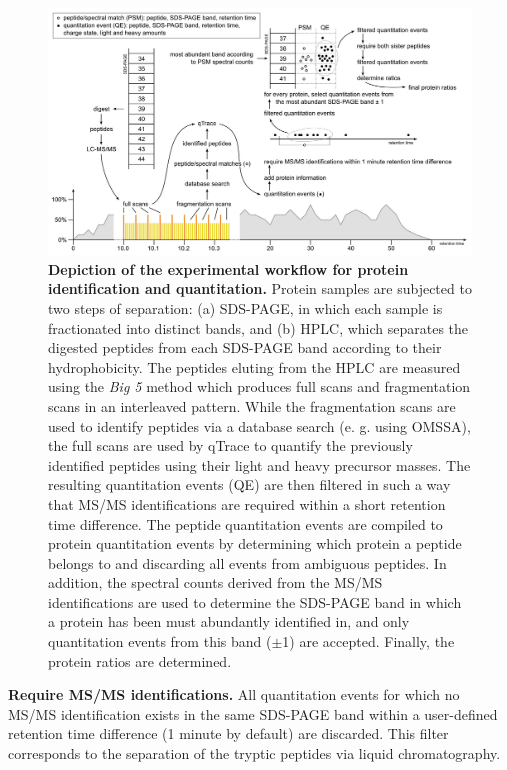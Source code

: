 \begin{figure}
\includegraphics[width=\textwidth]{figures/exp-setup.jpg}
\caption{
    {\bf Depiction of the experimental workflow for protein identification and 
    quantitation. }
    Protein samples are subjected to two steps of separation: (a) SDS-PAGE, in 
    which each sample is fractionated into distinct bands, and (b) HPLC, which 
    separates the digested peptides from each SDS-PAGE band according to their 
    hydrophobicity. 
    The peptides eluting from the HPLC are measured using the {\em Big 5} 
    method which produces full scans and fragmentation scans in an interleaved 
    pattern. 
    While the fragmentation scans are used to identify peptides via a database 
    search (e. g. using OMSSA), the full scans are used by qTrace to quantify 
    the previously identified peptides using their light and heavy precursor 
    masses.
    The resulting quantitation events (QE) are then filtered in such a way
    that MS/MS identifications are required within a short retention time 
    difference. 
    The peptide quantitation events are compiled to protein quantitation events
    by determining which protein a peptide belongs to and discarding all events
    from ambiguous peptides.
    In addition, the spectral counts derived from the MS/MS identifications are 
    used to determine the SDS-PAGE band in which a protein has been must 
    abundantly identified in, and only quantitation events from this band 
    ($\pm$1) are accepted.
    Finally, the protein ratios are determined.
}
\label{fig:exp-setup}
\end{figure}

{\bf Require MS/MS identifications.}
All quantitation events for which no MS/MS identification exists in the same 
SDS-PAGE band within a user-defined retention time difference (1 minute by 
default) are discarded. This filter corresponds to the separation of the 
tryptic peptides via liquid chromatography.


